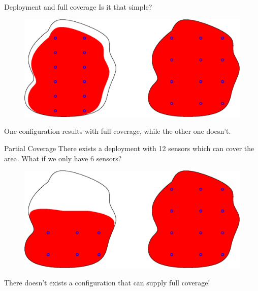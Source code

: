 \documentclass[t]{beamer}
\begin{document}
\begin{frame}[label=motivation7]{Deployment and full coverage}
Is it that simple?

\begin{figure}[b]
\includegraphics[scale=0.5]{motivation/deployment-configuration-partial-full-example.eps}
\end{figure}
One configuration results with full coverage, while the other one doesn't.
\end{frame}
\begin{frame}[label=motivation8]{Partial Coverage}
There exists a deployment with 12 sensors which can cover the area. What if we only have 6 sensors?

\begin{figure}[b]
\includegraphics[scale=0.5]{motivation/deployment-configuration-partial-no-enough-sensors.eps}
\end{figure}
There doesn't exists a configuration that can supply full coverage!
\end{frame}
\end{document}
